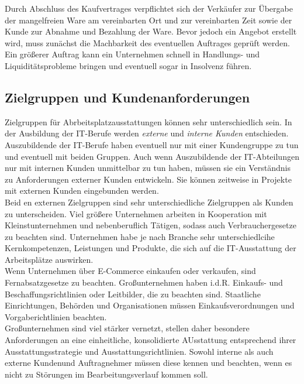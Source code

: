 \documentclass[a4paper, 12pt]{report}
\begin{document}
\begin{multicols}{2}
Durch Abschluss des Kaufvertrages verpflichtet sich der Verkäufer zur Übergabe
der mangelfreien Ware am vereinbarten Ort und zur vereinbarten Zeit sowie der
Kunde zur Abnahme und Bezahlung der Ware. Bevor jedoch ein Angebot erstellt
wird, muss zunächst die Machbarkeit des eventuellen Auftrages geprüft werden.
Ein größerer Auftrag kann ein Unternehmen schnell in Handlungs- und
Liquiditätsprobleme bringen und eventuell sogar in Insolvenz führen.

\subsection{Zielgruppen und Kundenanforderungen}

Zielgruppen für Abrbeitsplatzausstattungen können sehr unterschiedlich sein. In
der Ausbildung der IT-Berufe werden \emph{externe} und \emph{interne Kunden}
entschieden. Auszubildende der IT-Berufe haben eventuell nur mit einer
Kundengruppe zu tun und eventuell mit beiden Gruppen. Auch wenn Auszubildende
der IT-Abteilungen nur mit internen Kunden unmittelbar zu tun haben, müssen sie
ein Verständnis zu Anforderungen externer Kunden entwickeln. Sie können
zeitweise in Projekte mit externen Kunden eingebunden werden. \\

Beid en externen Zielgruppen sind sehr unterschiedliche Zielgruppen als Kunden
zu unterscheiden. Viel größere Unternehmen arbeiten in Kooperation mit
Kleinstunternehmen und nebenberuflich Tätigen, sodass auch Verbrauchergesetze zu
beachten sind. Unternehmen habe je nach Branche sehr unterschiedlcihe
Kernkompetenzen, Leistungen und Produkte, die sich auf die IT-Ausstattung der
Arbeitsplätze auswirken. \\

Wenn Unternehmen über E-Commerce einkaufen oder verkaufen, sind
Fernabsatzgesetze zu beachten. Großunternehmen haben i.d.R. Einkaufs- und
Beschaffungsrichtlinien oder Leitbilder, die zu beachten sind. Staatliche
Einrichtungen, Behörden und Organisationen müssen Einkaufsverordnungen und
Vorgaberichtlinien beachten. \\

Großunternehmen sind viel stärker vernetzt, stellen daher besondere
Anforderungen an eine einheitliche, konsolidierte AUsstattung entsprechend ihrer
Ausstattungsstrategie und Ausstattungsrichtlinien. Sowohl interne als auch
externe Kundenund Auftragnehmer müssen diese kennen und beachten, wenn es nicht
zu Störungen im Bearbeitungsverlauf kommen soll.


\end{multicols}
\end{document}
